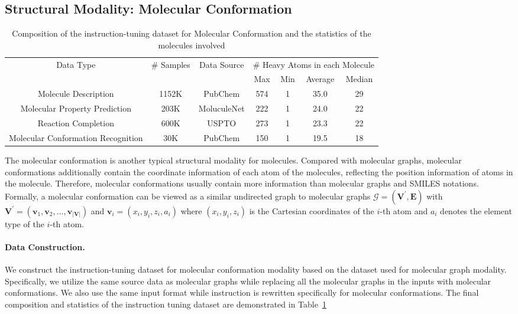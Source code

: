 \subsection{Structural Modality: Molecular Conformation}\label{sec:3d}

\begin{table}[t]
    \centering
    \begin{tabular}{ccccccc}
    \toprule
        \multirow{2}{*}{Data Type} & \multirow{2}{*}{\# Samples} & \multirow{2}{*}{Data Source} & \multicolumn{4}{c}{\# Heavy Atoms in each Molecule} \\
        & & & Max & Min & Average & Median \\
    \midrule
        Molecule Description & 1152K & PubChem & 574 & 1 & 35.0 & 29 \\
        Molecular Property Prediction & 203K & MoluculeNet & 222 & 1 & 24.0 & 22\\
        Reaction Completion & 600K & USPTO & 273 & 1 & 23.3 & 22\\
        Molecular Conformation Recognition & 30K & PubChem & 150 & 1 & 19.5 & 18\\
    \bottomrule
    \end{tabular}
    \caption{Composition of the instruction-tuning dataset for Molecular Conformation and the statistics of the molecules involved}
    \label{tab:data3d}
\end{table}

The molecular conformation is another typical structural modality for molecules. Compared with molecular graphs, molecular conformations additionally contain the coordinate information of each atom of the molecules, reflecting the position information of atoms in the molecule. Therefore, molecular conformations usually contain more information than molecular graphs and SMILES notations. Formally, a molecular conformation can be viewed as a similar undirected graph to molecular graphs $\mathcal{G} = (\mathbf{V}^\prime, \mathbf{E})$ with $\mathbf{V}^\prime = (\boldsymbol{v}_1, \boldsymbol{v}_2, \dots, \boldsymbol{v}_{|\mathbf{V}|})$ and $\boldsymbol{v}_i=(x_i, y_i, z_i, a_i)$ where $(x_i, y_i, z_i)$ is the Cartesian coordinates of the $i$-th atom and $a_i$ denotes the element type of the $i$-th atom.

\paragraph{Data Construction.} We construct the instruction-tuning dataset for molecular conformation modality based on the dataset used for molecular graph modality. Specifically, we utilize the same source data as molecular graphs while replacing all the molecular graphs in the inputs with molecular conformations. We also use the same input format while instruction is rewritten specifically for molecular conformations.
The final composition and statistics of the instruction tuning dataset are demonstrated in Table~\ref{tab:data3d}

